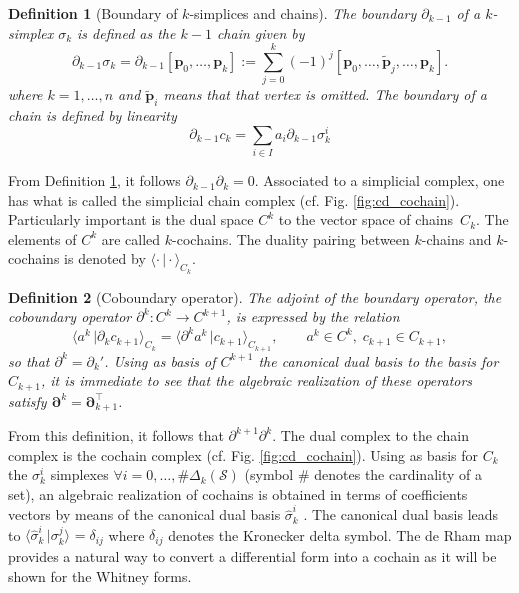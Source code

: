 \documentclass{elsarticle}
\newtheorem{definition}{Definition}
\newcommand*{\dual}[1]{\ensuremath{\widehat{#1}}}
\newcommand{\dualpr}[3][]{\ensuremath{\langle #2 \, \vert #3 \rangle_{#1}}}
\begin{document}
\begin{definition}[Boundary of $k$-simplices and chains]\label{def:bd_chain}
The boundary $\partial_{k-1}$ of a $k$-simplex $\sigma_k$ is  defined as the $k-1$ chain given by
\begin{equation}
    \partial_{k-1}\sigma_k = \partial_{k-1} [\mathbf{p}_0, \dots, \mathbf{p}_k] := \sum_{j=0}^k (-1)^j [\mathbf{p}_0, \dots, \widetilde{\mathbf{p}}_{j},  \dots,\mathbf{p}_k].
\end{equation}
where $k=1, \dots, n$ and $\widetilde{\mathbf{p}}_{i}$ means that that vertex is omitted. The boundary of a chain is defined by linearity
\begin{equation}
    \partial_{k-1} c_k = \sum_{i \in I} a_i \partial_{k-1} \sigma_k^i
\end{equation}
\end{definition}
From Definition \ref{def:bd_chain}, it follows $\partial_{k-1}\partial_k=0$. Associated to a simplicial complex, one has what is called
the simplicial chain complex (cf. Fig. \ref{fig:cd_cochain}).
Particularly important is the dual space $C^k$ to the vector space of chains~$C_k$. The elements of $C^k$ are called $k$-cochains. The duality pairing between $k$-chains and $k$-cochains is denoted by $\dualpr[C_k]{\cdot}{\cdot}$.
\begin{definition}[Coboundary operator]
The adjoint of the boundary operator, the coboundary operator $\partial^k : C^k \rightarrow C^{k+1}$, is expressed by the relation
\begin{equation}
    \dualpr[C_k]{a^k}{\partial_{k} c_{k+1}} = \dualpr[C_{k+1}]{\partial^k a^k}{c_{k+1}}, \qquad a^k \in C^k, \; c_{k+1} \in C_{k+1},
\end{equation}
so that $\partial^k = \partial_{k}'$. Using as basis of $C^{k+1}$ the canonical dual basis to the basis for $C_{k+1}$, it is immediate to see that the algebraic realization of these operators satisfy $\bm{\partial}^k = \bm{\partial}_{k+1}^\top$.
\end{definition}
From this definition, it follows that $\partial^{k+1}\partial^{k}$. The dual complex to the chain complex is the cochain complex (cf. Fig. \ref{fig:cd_cochain}). Using as basis  for $C_k$ the $\sigma_k^i$ simplexes $\forall i=0, \dots, \# \Delta_k(\mathcal{S})$ (symbol $\#$ denotes the cardinality of a set), an algebraic realization of cochains is obtained in terms of coefficients vectors by means of the canonical dual basis $\dual{\sigma}_k^i$ \cite{bochev2006,hiemstra2014}. The
canonical dual basis leads to $\dualpr{\dual{\sigma}_k^i}{\sigma_k^j}=\delta_{ij}$ where $\delta_{ij}$ denotes the Kronecker delta symbol. The de Rham map provides a natural way to convert a differential form into a cochain as it will be shown for the Whitney forms.
\end{document}
